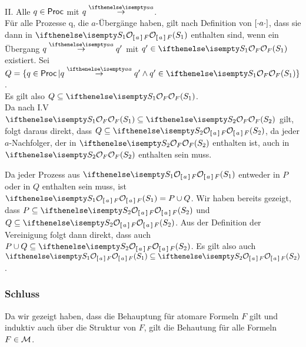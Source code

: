 II. Alle $q \in \operatorname{\sf Proc}$ mit $q \CCSTrans{a}$. \\
Für alle Prozesse q, die $a$-Übergänge haben, gilt nach Definition von $[ \cdot a \cdot ] $,
 dass sie dann in $\OSem{\necess{a}F}{S_1}$ enthalten sind,
wenn ein Übergang $q \CCSTrans{a} q'$ mit $q' \in \OSem{F}{S_1}$ existiert.
Sei $Q = \{ q \in \Proc | q \CCSTrans{a} q' \land q' \in \OSem{F}{S_1} \} $. \\
Es gilt also $Q \subseteq \OSem{F}{S_1}$. \\

Da nach I.V $\OSem{F}{S_1} \subseteq \OSem{F}{S_2}$ gilt, folgt daraus direkt, dass
$Q \subseteq \OSem{\necess{a}F}{S_2}$, da jeder $a$-Nachfolger, der in $\OSem{F}{S_2}$ enthalten ist, auch in $\OSem{F}{S_2}$ enthalten sein muss.


Da jeder Prozess aus $\OSem{\necess{a}F}{S_1}$ entweder in $P$ oder in $Q$
 enthalten sein muss, ist $\OSem{\necess{a}F}{S_1} = P \cup Q$.
Wir haben bereits gezeigt, dass $P \subseteq \OSem{\necess{a}F}{S_2}$ und
 $Q \subseteq \OSem{\necess{a}F}{S_2}$. Aus der Definition der Vereinigung folgt dann direkt,
 dass auch  $P \cup Q \subseteq \OSem{\necess{a}F}{S_2}$.
Es gilt also auch $\OSem{\necess{a}F}{S_1} \subseteq \OSem{\necess{a}F}{S_2}$.


\subsubsection*{Schluss}
Da wir gezeigt haben, dass die Behauptung für atomare Formeln $F$ gilt und induktiv auch über die Struktur von $F$, gilt die Behautung für alle Formeln $F \in \mathcal{M}$.
